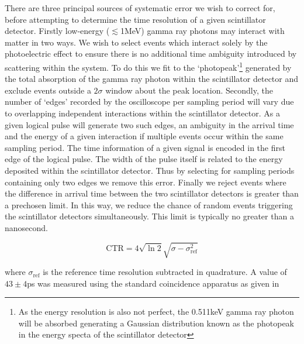 There are three principal sources of systematic error we wish to correct for, before attempting to determine the time resolution of a given scintillator detector. Firstly low-energy ($\lesssim$1MeV) gamma ray photons may interact with matter in two ways. We wish to select events which interact solely by the photoelectric effect to ensure there is no additional time ambiguity introduced by scattering within the system. To do this we fit to the `photopeak'\footnote{As the energy resolution is also not perfect, the 0.511keV gamma ray photon will be absorbed generating a Gaussian distribution known as the photopeak in the energy specta of the scintillator detector} generated by the total absorption of the gamma ray photon within the scintillator detector and exclude events outside a $2\sigma$ window about the peak location. Secondly, the number of `edges' recorded by the oscilloscope per sampling period will vary due to overlapping independent interactions within the scintillator detector. As a given logical pulse will generate two such edges, an ambiguity in the arrival time and the energy of a given interaction if multiple events occur within the same sampling period. The time information of a given signal is encoded in the first edge of the logical pulse. The width of the pulse itself is related to the energy deposited within the scintillator detector. Thus by selecting for sampling periods containing only two edges we remove this error. Finally we reject events where the difference in arrival time between the two scintillator detectors is greater than a prechosen limit. In this way, we reduce the chance of random events triggering the scintillator detectors simultaneously. This limit is typically no greater than a nanosecond.


\begin{equation}
\textrm{CTR} = 4\sqrt{\ln{2}}\sqrt{\sigma-\sigma_\textrm{ref}^2}
\label{eqn:ctr-fromreference}
\end{equation}

where $\sigma_\text{ref}$ is the reference time resolution subtracted in quadrature. A value of $43\pm4$ps was measured using the standard coincidence apparatus as given in \cite{ch_Meyer_Pizzichemi_Lecoq_2013}


